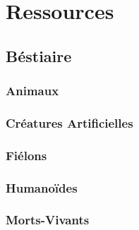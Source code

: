 \documentclass{dd}
\begin{document}
\part{Ressources}

\chapter{Béstiaire}

\section{Animaux}



\section{Créatures Artificielles}









\section{Fiélons}










\section{Humanoïdes}











\section{Morts-Vivants}
\end{document}
